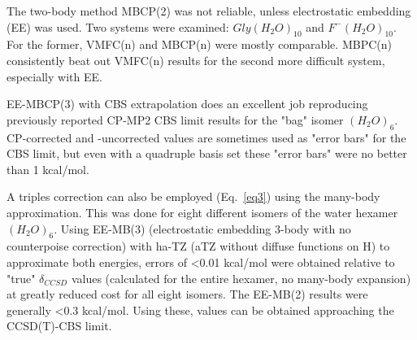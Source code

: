 \documentclass[12pt,a4paper]{article}
\begin{document}
	The two-body method MBCP(2) was not reliable, unless electrostatic embedding (EE) was used. Two systems were examined: $Gly(H_{2}O)_{10}$ and $F^{-}(H_{2}O)_{10}$. For the former, VMFC(n) and MBCP(n) were mostly comparable. MBPC(n) consistently beat out VMFC(n) results for the second more difficult system, especially with EE.
	
	EE-MBCP(3) with CBS extrapolation does an excellent job reproducing previously reported CP-MP2 CBS limit results for the "bag" isomer $(H_{2}O)_{6}$. CP-corrected and -uncorrected values are sometimes used as "error bars" for the CBS limit, but even with a quadruple basis set these "error bars" were no better than 1 kcal/mol. 
	
	A triples correction can also be employed (Eq.~\eqref{eq3}) using the many-body approximation. This was done for eight different isomers of the water hexamer $(H_{2}O)_{6}$. Using EE-MB(3) (electrostatic embedding 3-body with no counterpoise correction) with ha-TZ (aTZ without diffuse functions on H) to approximate both energies, errors of <0.01 kcal/mol were obtained relative to "true" $\delta_{CCSD}$ values (calculated for the entire hexamer, no many-body expansion) at greatly reduced cost for all eight isomers. The EE-MB(2) results were generally <0.3 kcal/mol. Using these, values can be obtained approaching the CCSD(T)-CBS limit.

%

\end{document}
